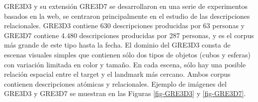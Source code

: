 \label{sec:corpusGRE}
GRE3D3 y su extensi\'on GRE3D7 \cite{gre3d3,gre3d7} se desarrollaron en una serie de experimentos basados en la web, se centraron principalmente en el estudio de las descripciones relacionales. GRE3D3 contiene 630 descripciones producidas por 63 personas y GRE3D7 contiene 4.480 descripciones producidas por 287 personas, y es el corpus m\'as grande de este tipo hasta la fecha. El dominio del GRE3D3 consta de escenas visuales simples que contienen s\'olo dos tipos de objetos (cubos y esferas) con variaci\'on limitada en color y tama\~no. En cada escena, s\'olo hay una posible relaci\'on espacial entre el target y el landmark m\'as cercano. Ambos corpus contienen descripciones at\'omicas y relacionales. Ejemplo de im\'agenes del GRE3D3 y GRE3D7 se muestran en las Figuras \ref{fig-GRE3D3} y \ref{fig-GRE3D7}.


